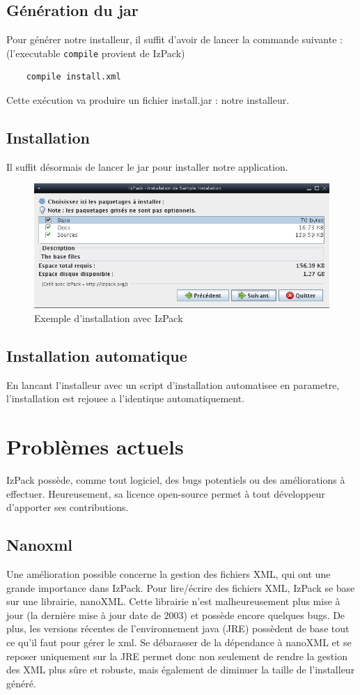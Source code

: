 \subsection{Génération du jar}
Pour générer notre installeur, il suffit d'avoir de lancer la commande suivante : (l'executable \verb|compile| provient de IzPack)
\begin{verbatim}
	compile install.xml
\end{verbatim}
Cette exécution va produire un fichier install.jar : notre installeur.
\subsection{Installation}
Il suffit désormais de lancer le jar pour installer notre application.
\begin{figure}[H]
	\centering
	\includegraphics[width=15cm]{../image/installSample.png}
	\caption{Exemple d'installation avec IzPack}
\end{figure}

\subsection{Installation automatique}
En lancant l'installeur avec un script d'installation automatisee en parametre, l'installation est rejouee a l'identique automatiquement.

\section{Problèmes actuels}
IzPack possède, comme tout logiciel, des bugs potentiels ou des améliorations à effectuer.
Heureusement, sa licence open-source permet à tout développeur d'apporter ses contributions.

\subsection{Nanoxml}
Une amélioration possible concerne la gestion des fichiers XML, qui ont une grande importance dans IzPack.
Pour lire/écrire des fichiers XML, IzPack se base sur une librairie, nanoXML. Cette librairie n'est malheureusement plus mise à jour (la dernière mise à jour date de 2003) et possède encore quelques bugs.
De plus, les versions récentes de l'environnement java (JRE) possèdent de base tout ce qu'il faut pour gérer le xml.
Se débarasser de la dépendance à nanoXML et se reposer uniquement sur la JRE permet donc non seulement de rendre la gestion des XML plus sûre et robuste, mais également de diminuer la taille de l'installeur généré.
